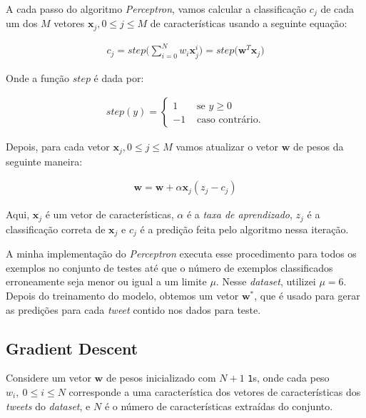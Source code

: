 \documentclass[a4paper, 12pt]{article}
\begin{document}
A cada passo do algoritmo \textit{Perceptron}, vamos calcular a classificação
$c_j$ de cada um dos $M$ vetores $\boldsymbol{x}_j, 0 \leq j \leq M$ de características
usando a seguinte equação:

\begin{align*}
    c_j = step\bigg(\sum_{i = 0}^{N}{w_i\boldsymbol{x}_{j}^{i}}\bigg) = step\bigg(\boldsymbol{w}^{T}\boldsymbol{x}_j\bigg)
\end{align*}

Onde a função $step$ é dada por:

\begin{align*}
    step(y) = \begin{cases}
        1 & \text{ se } y \geq 0 \\
        -1 & \text{ caso contrário.}
    \end{cases}
\end{align*}

Depois, para cada vetor $\boldsymbol{x}_j, 0 \leq j \leq M$ vamos atualizar o vetor
$\boldsymbol{w}$ de pesos da seguinte maneira:

\begin{align*}
    \boldsymbol{w} = \boldsymbol{w} + \alpha\boldsymbol{x}_j(z_j - c_j)
\end{align*}

Aqui, $\boldsymbol{x}_j$ é um vetor de características, $\alpha$ é a
\textit{taxa de aprendizado}, $z_j$ é a classificação correta de
$\boldsymbol{x}_j$ e $c_j$ é a predição feita pelo algoritmo nessa iteração.

A minha implementação do \textit{Perceptron} executa esse procedimento para
todos os exemplos no conjunto de testes até que o número de exemplos
classificados erroneamente seja menor ou igual a um limite $\mu$. Nesse
\textit{dataset}, utilizei $\mu = 6$. Depois do treinamento do modelo, obtemos
um vetor $\boldsymbol{w}^{*}$, que é usado para gerar as predições para cada \textit{tweet}
contido nos dados para teste.

\subsection{Gradient Descent} \label{sec:gd}

Considere um vetor $\boldsymbol{w}$ de pesos inicializado
com $N + 1$ \texttt{1}s, onde cada peso $w_i,\: 0 \leq i \leq N$
corresponde a uma característica dos vetores de características
dos \textit{tweets} do \textit{dataset}, e $N$ é o número
de características extraídas do conjunto.
\end{document}
